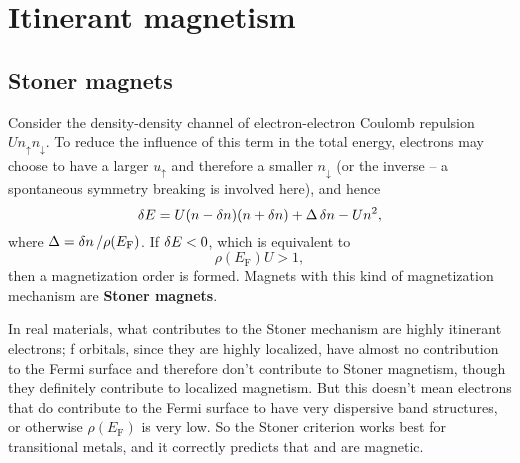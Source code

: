 \documentclass[hyperref, a4paper]{article}
\newcommand*{\concept}[1]{{\textbf{#1}}}
\newcommand*{\efermi}{E_{\text{F}}}
\begin{document}
\section{Itinerant magnetism}

\subsection{Stoner magnets}

Consider the density-density channel of electron-electron Coulomb repulsion $U n_\uparrow n_\downarrow$. 
To reduce the influence of this term in the total energy, 
electrons may choose to have a larger $u_\uparrow$ and therefore a smaller $n_{\downarrow}$
(or the inverse -- a spontaneous symmetry breaking is involved here),
and hence 
\begin{equation}
    \var{E} = U (n - \var{n}) (n + \var{n}) + \Delta \var{n} - U n^2,
\end{equation}
where $\Delta = \var{n} / \rho(\efermi)$.
If $\var{E} < 0$, which is equivalent to 
\begin{equation}
    \rho(\efermi) U > 1,
\end{equation}
then a magnetization order is formed. 
Magnets with this kind of magnetization mechanism 
are \concept{Stoner magnets}.

In real materials, 
what contributes to the Stoner mechanism 
are highly itinerant electrons;
f orbitals, since they are highly localized, 
have almost no contribution to the Fermi surface 
and therefore don't contribute to Stoner magnetism,
though they definitely contribute to localized magnetism.
But this doesn't mean electrons that do contribute to the Fermi surface 
to have very dispersive band structures,
or otherwise $\rho(\efermi)$ is very low. 
So the Stoner criterion works best for transitional metals, 
and it correctly predicts that  and  are magnetic.
\end{document}
